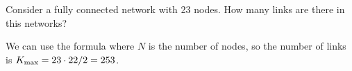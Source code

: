 Consider a fully connected network with 23 nodes. How many links are there in this networks?

\solution
We can use the formula
where $N$ is the number of nodes, so the number of links is $K_{\rm max}=23\cdot 22 / 2 = 253$.

